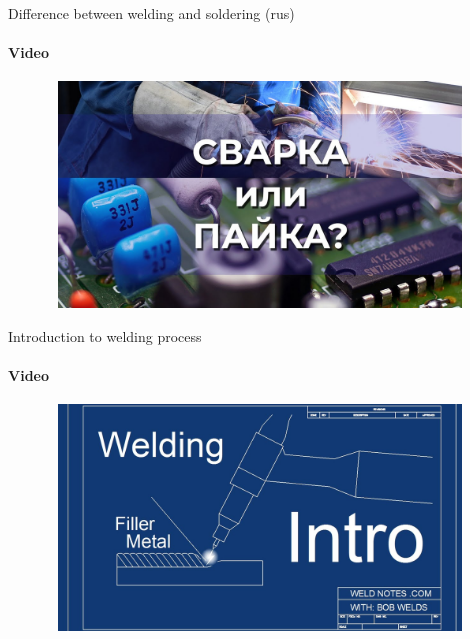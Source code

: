 \documentclass[aspectratio=169]{beamer}
\begin{document}
\begin{frame}[t]{Difference between welding and soldering (rus)}
    \framesubtitle{Video}
    \vspace{-0.6cm}
    \begin{figure}[H]
        \href{https://youtu.be/msRRSCB1G10}{
            \centering\includegraphics[height=6cm,width=1\textwidth,keepaspectratio]{diff_welding_soldering_video.jpg}}
        \label{fig:diff_welding_soldering_video.jpg}
    \end{figure}
\end{frame}

\begin{frame}[t]{Introduction to welding process}
    \framesubtitle{Video}
    \vspace{-0.6cm}
    \begin{figure}[H]
        \href{https://youtu.be/jQddm3YONNc}{
            \centering\includegraphics[height=6cm,width=1\textwidth,keepaspectratio]{into_to_welding_video.jpg}}
        \label{fig:into_to_welding_video.jpg}
    \end{figure}
\end{frame}
\end{document}
